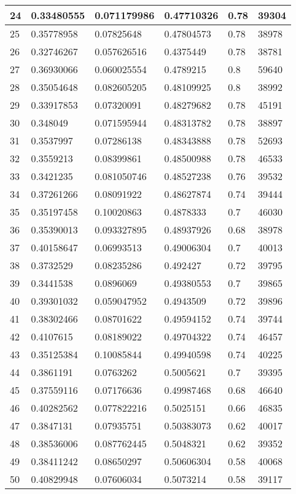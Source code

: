 \begin{longtable}{|l|l|l|l|l|l|}
24 & 0.33480555 & 0.071179986 & 0.47710326 & 0.78 & 39304 \\ \hline 
25 & 0.35778958 & 0.07825648 & 0.47804573 & 0.78 & 38978 \\ \hline 
26 & 0.32746267 & 0.057626516 & 0.4375449 & 0.78 & 38781 \\ \hline 
27 & 0.36930066 & 0.060025554 & 0.4789215 & 0.8 & 59640 \\ \hline 
28 & 0.35054648 & 0.082605205 & 0.48109925 & 0.8 & 38992 \\ \hline 
29 & 0.33917853 & 0.07320091 & 0.48279682 & 0.78 & 45191 \\ \hline 
30 & 0.348049 & 0.071595944 & 0.48313782 & 0.78 & 38897 \\ \hline 
31 & 0.3537997 & 0.07286138 & 0.48343888 & 0.78 & 52693 \\ \hline 
32 & 0.3559213 & 0.08399861 & 0.48500988 & 0.78 & 46533 \\ \hline 
33 & 0.3421235 & 0.081050746 & 0.48527238 & 0.76 & 39532 \\ \hline 
34 & 0.37261266 & 0.08091922 & 0.48627874 & 0.74 & 39444 \\ \hline 
35 & 0.35197458 & 0.10020863 & 0.4878333 & 0.7 & 46030 \\ \hline 
36 & 0.35390013 & 0.093327895 & 0.48937926 & 0.68 & 38978 \\ \hline 
37 & 0.40158647 & 0.06993513 & 0.49006304 & 0.7 & 40013 \\ \hline 
38 & 0.3732529 & 0.08235286 & 0.492427 & 0.72 & 39795 \\ \hline 
39 & 0.3441538 & 0.0896069 & 0.49380553 & 0.7 & 39865 \\ \hline 
40 & 0.39301032 & 0.059047952 & 0.4943509 & 0.72 & 39896 \\ \hline 
41 & 0.38302466 & 0.08701622 & 0.49594152 & 0.74 & 39744 \\ \hline 
42 & 0.4107615 & 0.08189022 & 0.49704322 & 0.74 & 46457 \\ \hline 
43 & 0.35125384 & 0.10085844 & 0.49940598 & 0.74 & 40225 \\ \hline 
44 & 0.3861191 & 0.0763262 & 0.5005621 & 0.7 & 39395 \\ \hline 
45 & 0.37559116 & 0.07176636 & 0.49987468 & 0.68 & 46640 \\ \hline 
46 & 0.40282562 & 0.077822216 & 0.5025151 & 0.66 & 46835 \\ \hline 
47 & 0.3847131 & 0.07935751 & 0.50383073 & 0.62 & 40017 \\ \hline 
48 & 0.38536006 & 0.087762445 & 0.5048321 & 0.62 & 39352 \\ \hline 
49 & 0.38411242 & 0.08650297 & 0.50606304 & 0.58 & 40068 \\ \hline 
50 & 0.40829948 & 0.07606034 & 0.5073214 & 0.58 & 39117 \\ \hline 
\end{longtable}